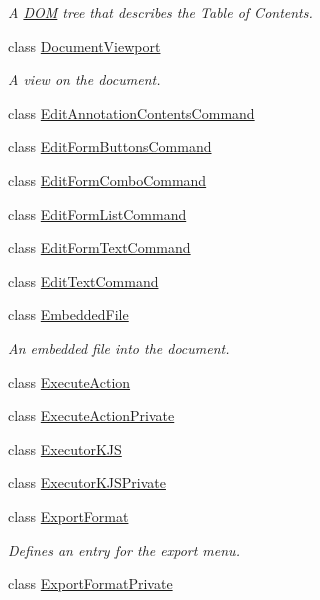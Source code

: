 \begin{DoxyCompactItemize}
\begin{DoxyCompactList}\small\item\em A \hyperlink{namespaceDOM}{D\+O\+M} tree that describes the Table of Contents. \end{DoxyCompactList}\item 
class \hyperlink{classOkular_1_1DocumentViewport}{Document\+Viewport}
\begin{DoxyCompactList}\small\item\em A view on the document. \end{DoxyCompactList}\item 
class \hyperlink{classOkular_1_1EditAnnotationContentsCommand}{Edit\+Annotation\+Contents\+Command}
\item 
class \hyperlink{classOkular_1_1EditFormButtonsCommand}{Edit\+Form\+Buttons\+Command}
\item 
class \hyperlink{classOkular_1_1EditFormComboCommand}{Edit\+Form\+Combo\+Command}
\item 
class \hyperlink{classOkular_1_1EditFormListCommand}{Edit\+Form\+List\+Command}
\item 
class \hyperlink{classOkular_1_1EditFormTextCommand}{Edit\+Form\+Text\+Command}
\item 
class \hyperlink{classOkular_1_1EditTextCommand}{Edit\+Text\+Command}
\item 
class \hyperlink{classOkular_1_1EmbeddedFile}{Embedded\+File}
\begin{DoxyCompactList}\small\item\em An embedded file into the document. \end{DoxyCompactList}\item 
class \hyperlink{classOkular_1_1ExecuteAction}{Execute\+Action}
\item 
class \hyperlink{classOkular_1_1ExecuteActionPrivate}{Execute\+Action\+Private}
\item 
class \hyperlink{classOkular_1_1ExecutorKJS}{Executor\+K\+J\+S}
\item 
class \hyperlink{classOkular_1_1ExecutorKJSPrivate}{Executor\+K\+J\+S\+Private}
\item 
class \hyperlink{classOkular_1_1ExportFormat}{Export\+Format}
\begin{DoxyCompactList}\small\item\em Defines an entry for the export menu. \end{DoxyCompactList}\item 
class \hyperlink{classOkular_1_1ExportFormatPrivate}{Export\+Format\+Private}

\end{DoxyCompactItemize}

